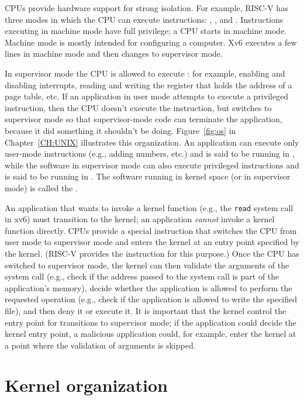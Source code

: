 CPUs provide hardware support for strong isolation.   For
example, RISC-V has three modes in which
the CPU can execute instructions:
,
, and
.
Instructions executing in machine mode have full privilege; a
CPU starts in machine mode.  Machine mode is mostly intended for
configuring a computer.  Xv6 executes a few lines in machine mode and
then changes to supervisor mode.

In supervisor mode the CPU is allowed to execute 
:
for example, enabling and disabling interrupts,  reading and writing
the register that holds the address of a page table, etc.
If an application in user mode attempts to execute
a privileged instruction, then the CPU doesn't execute the instruction, but switches
to supervisor mode so that supervisor-mode code can terminate the application,
because it did something it shouldn't be doing. 
Figure~\ref{fig:os}
in Chapter~\ref{CH:UNIX} illustrates this organization.  An application can
execute only user-mode instructions (e.g., adding numbers, etc.) and is said to
be running in 
,
while the software in supervisor mode can also execute privileged instructions and
is said to be running in
.
The software running in kernel space (or in supervisor mode) is called
the
.

An application that wants to invoke a kernel function (e.g., the
\lstinline{read}
system call in xv6) must 
transition to the kernel; an application \emph{cannot} invoke a kernel
function directly.  CPUs provide a special instruction that switches the
CPU from user mode to supervisor mode and enters the kernel at an entry point
specified by the kernel.  (RISC-V
provides the 
instruction for this purpose.)  Once the CPU has switched to supervisor mode,
the kernel can then validate the arguments of the system call (e.g.,
check if the address passed to the system call is part of the application's memory), decide whether
the application is allowed to perform the requested operation (e.g.,
check if the application is allowed to write the specified file), and then deny it
or execute it.  It is important that the kernel control the entry point for
transitions to supervisor mode; if the application could decide the kernel entry
point, a malicious application could, for example, enter the kernel at a point where the
validation of arguments is skipped.

\section{Kernel organization}


